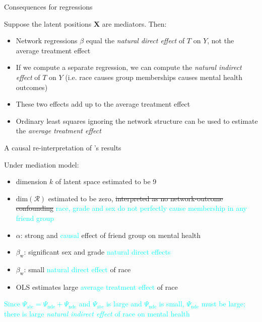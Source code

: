 \documentclass{beamer}
\theoremstyle{remark}
\newcommand{\X}{\bm X}
\begin{document}
\begin{frame}{Consequences for regressions}

    Suppose the latent positions $\X$ are mediators. Then:

    \begin{itemize}
        \item Network regressions $\beta$ equal the \emph{natural direct effect} of $T$ on $Y$, not the average treatment effect
        \item If we compute a separate regression, we can compute the \emph{natural indirect effect} of $T$ on $Y$ (i.e. race causes group memberships causes mental health outcomes)
        \item These two effects add up to the average treatment effect
        \item Ordinary least squares ignoring the network structure can be used to estimate the \emph{average treatment effect}
    \end{itemize}

\end{frame}

\begin{frame}{A causal re-interpretation of \cite{le_linear_2021}'s results}

    Under mediation model:

    \begin{itemize}
        \item dimension $k$ of latent space estimated to be 9
        \item $\mathrm{dim}(\mathcal R)$ estimated to be zero, \sout{interpreted as no network-outcome confounding} \textcolor{cyan}{race, grade and sex do not perfectly cause membership in any friend group}
        \item $\alpha$: strong and \textcolor{cyan}{causal} effect of friend group on mental health
        \item $\beta_\text{w}$: significant sex and grade \textcolor{cyan}{natural direct effects}
        \item $\beta_\text{w}$: small \textcolor{cyan}{natural direct effect} of race
        \item OLS estimates large \textcolor{cyan}{average treatment effect} of race
    \end{itemize}

    \textcolor{cyan}{Since $\Psi_\text{ate} = \Psi_\text{nde} + \Psi_\text{nde}$ and $\Psi_\text{ate}$ is large and $\Psi_\text{nde}$ is small, $\Psi_\text{nde}$ must be large; there is large \emph{natural indirect effect} of race on mental health}

\end{frame}
\end{document}
